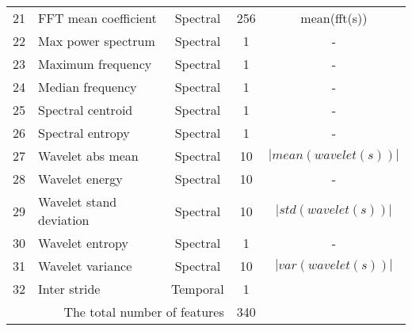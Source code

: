 {\begin{tabularx}{\linewidth}{@{}rlccc@{}}
  21 & FFT mean coefficient         & Spectral   & 256 & mean(fft(s)) \\
  22 & Max power spectrum         & Spectral   & 1 & -\\%
  23 & Maximum frequency         & Spectral   & 1 & -\\
  24 & Median frequency         & Spectral   & 1 & -\\
  25 & Spectral centroid         & Spectral   & 1 & -\\
  26 & Spectral entropy         & Spectral   & 1 & -\\
  27 & Wavelet abs mean         & Spectral   & 10 & $|mean(wavelet(s))|$\\
  28 & Wavelet energy         & Spectral   & 10 & -\\%
  29 & Wavelet stand deviation         & Spectral   & 10& $|std(wavelet(s))|$\\
  30 & Wavelet entropy         & Spectral   & 1 & -\\%
  31 & Wavelet variance         & Spectral   & 10 & $|var(wavelet(s))|$\\ \hline
  32 & Inter stride         & Temporal   & 1\\ \hline
\multicolumn{3}{r}{The total number of features} & 340\\
\end{tabularx}\hspace*{-4cm}
}


